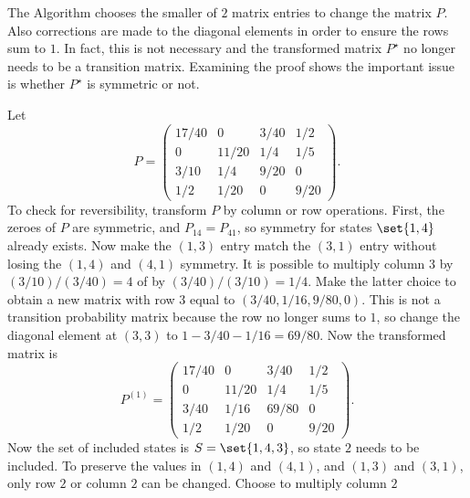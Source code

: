 \documentclass[12pt]{article}
\begin{document}
\begin{remark}
    The Algorithm chooses the smaller of \( 2 \) matrix entries to
    change the matrix \( P \).  Also corrections are made to the
    diagonal elements in order to ensure the rows sum to \( 1 \).  In
    fact, this is not necessary and the transformed matrix \( P^{\star} \)
    no longer needs to be a transition matrix.  Examining the proof
    shows the important issue is whether \( P^{\star} \) is symmetric or
    not.
\end{remark}

\begin{example}
    Let
    \[
        P =
        \begin{pmatrix}
            17/40       & 0     & 3/40  & 1/2 \\
            0   & 11/20 & 1/4   & 1/5 \\
            3/10        & 1/4   & 9/20  & 0 \\
            1/2 & 1/20  & 0     & 9/20
        \end{pmatrix}
        .
    \] To check for reversibility, transform \( P \) by column or row
    operations.  First, the zeroes of \( P \) are symmetric, and \( P_{14}
    = P_{41} \), so symmetry for states \( \set{1,4} \) already exists.
    Now make the \( (1,3) \) entry match the \( (3,1) \) entry without
    losing the \( (1,4) \) and \( (4,1) \) symmetry.  It is possible to
    multiply column \( 3 \) by \( (3/10)/(3/40) = 4 \) of by \( (3/40)/(3/10)
    = 1/4 \).  Make the latter choice to obtain a new matrix with row \(
    3 \) equal to \( (3/40, 1/16, 9/80, 0) \).  This is not a transition
    probability matrix because the row no longer sums to \( 1 \), so
    change the diagonal element at \( (3,3) \) to \( 1 - 3/40 - 1/16 =
    69/80 \).  Now the transformed matrix is
    \[
        P^{(1)} =
        \begin{pmatrix}
            17/40       & 0     & 3/40  & 1/2 \\
            0   & 11/20 & 1/4   & 1/5 \\
            3/40        & 1/16  & 69/80 & 0 \\
            1/2 & 1/20  & 0     & 9/20
        \end{pmatrix}
        .
    \] Now the set of included states is \( S = \set{1,4,3} \), so state
    \( 2 \) needs to be included.  To preserve the values in \( (1,4) \)
    and \( (4,1) \), and \( (1,3) \) and \( (3,1) \), only row \( 2 \)
    or column \( 2 \) can be changed. Choose to multiply column \( 2 \)

\end{example}
\end{document}
